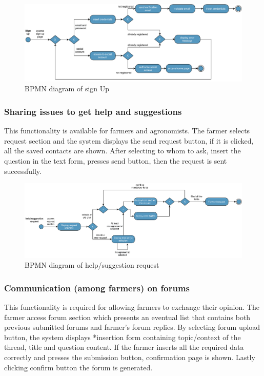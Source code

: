 \begin{figure}[H]
	\centering
    \includegraphics[width=\textwidth]{Images/BPMN/signup.pdf}
	\caption{\label{fig:bpmn_sign_up}BPMN diagram of sign Up}
\end{figure}

\subsubsection{Sharing issues to get help and suggestions}
This functionality is available for farmers and agronomists. The farmer selects request 
section and the system displays the send request button, if it is clicked, all the saved 
contacts are shown. After selecting to whom to ask, insert the question in the text form,
presses send button, then the request is sent successfully.


\begin{figure}[H]
	\centering
    \includegraphics[width=\textwidth]{Images/BPMN/help-suggestion-request.pdf}
	\caption{\label{fig:bpmn_request}BPMN diagram of help/suggestion request}
\end{figure}


\subsubsection{Communication (among farmers) on forums}
This functionality is required for allowing farmers to exchange their opinion. The farmer 
access forum section which presents an eventual list that contains both previous submitted 
forums and farmer’s forum replies. By selecting forum upload button, the system displays 
*insertion form containing topic/context of the thread, title and question content. If the farmer 
inserts all the required data correctly and presses the submission button, confirmation page is shown. Lastly clicking confirm button the forum is generated. 

